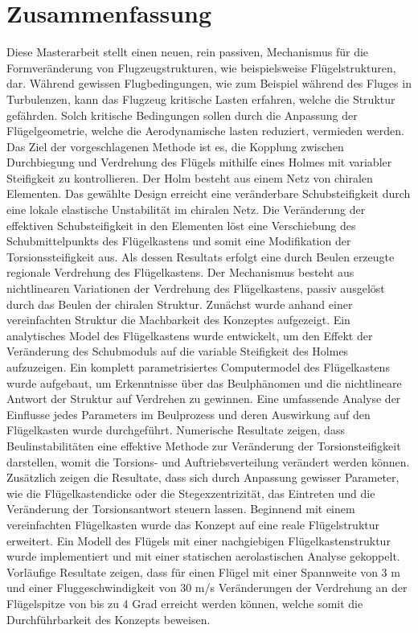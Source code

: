 \section*{Zusammenfassung}

Diese Masterarbeit stellt einen neuen, rein passiven, Mechanismus für die Formveränderung von Flugzeugstrukturen, wie beispielsweise Flügelstrukturen, dar. Während gewissen Flugbedingungen, wie zum Beispiel während des Fluges in Turbulenzen, kann das Flugzeug kritische Lasten erfahren, welche die Struktur gefährden. Solch kritische Bedingungen sollen durch die Anpassung der Flügelgeometrie, welche die Aerodynamische lasten reduziert, vermieden werden. Das Ziel der vorgeschlagenen Methode ist es, die Kopplung zwischen Durchbiegung und Verdrehung des Flügels mithilfe eines Holmes mit variabler Steifigkeit zu kontrollieren. Der Holm besteht aus einem Netz von chiralen Elementen. Das gewählte Design erreicht eine veränderbare Schubsteifigkeit durch eine lokale elastische Unstabilität im chiralen Netz. Die Veränderung der effektiven Schubsteifigkeit in den Elementen löst eine Verschiebung des Schubmittelpunkts des Flügelkastens und somit eine Modifikation der Torsionssteifigkeit aus. Als dessen Resultats erfolgt eine durch Beulen erzeugte regionale Verdrehung des Flügelkastens. Der Mechanismus besteht aus nichtlinearen Variationen der Verdrehung des Flügelkastens, passiv ausgelöst durch das Beulen der chiralen Struktur. Zunächst wurde anhand einer vereinfachten Struktur die Machbarkeit des Konzeptes aufgezeigt. Ein analytisches Model des Flügelkastens wurde entwickelt, um den Effekt der Veränderung des Schubmoduls auf die variable Steifigkeit des Holmes aufzuzeigen.  Ein komplett parametrisiertes Computermodel des Flügelkastens wurde aufgebaut, um Erkenntnisse über das Beulphänomen und die nichtlineare Antwort der Struktur auf Verdrehen zu gewinnen. Eine umfassende Analyse der Einflusse jedes Parameters im Beulprozess und deren Auswirkung auf den Flügelkasten wurde durchgeführt. Numerische Resultate zeigen, dass Beulinstabilitäten eine effektive Methode zur Veränderung der Torsionsteifigkeit darstellen, womit die Torsions- und Auftriebsverteilung verändert werden können. Zusätzlich zeigen die Resultate, dass sich durch Anpassung gewisser Parameter, wie die Flügelkastendicke oder die Stegexzentrizität, das Eintreten und die Veränderung der Torsionsantwort steuern lassen. Beginnend mit einem vereinfachten Flügelkasten wurde das Konzept auf eine reale Flügelstruktur erweitert. Ein Modell des Flügels mit einer nachgiebigen Flügelkastenstruktur wurde implementiert und mit einer statischen aerolastischen Analyse gekoppelt. Vorläufige Resultate zeigen, dass für einen Flügel mit einer Spannweite von 3 m und einer Fluggeschwindigkeit von 30 m/s Veränderungen der Verdrehung an der Flügelspitze von bis zu 4 Grad erreicht werden können, welche somit die Durchführbarkeit des Konzepts beweisen.

